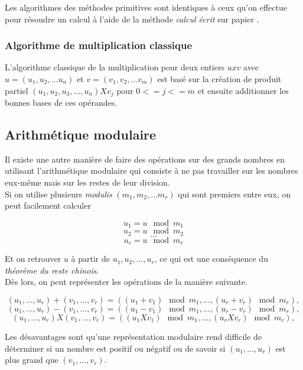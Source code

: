 \documentclass[letterpaper]{article}
\begin{document}
Les algorithmes des méthodes primitives sont identiques à ceux qu'on effectue
pour résoudre un calcul à l'aide de la méthode \emph{calcul écrit} sur papier
\cite{knuth1997aocp}.

\subsubsection{Algorithme de multiplication classique}

L'algorithme classique de la multiplication pour deux entiers $u x v$ avec
$u = (u_1, u_2, \dots u_n)$ et $v = (v_1, v_2, \dots v_m)$ est basé sur la
création de produit partiel $(u_1, u_2, u_3, \dots, u_n) X v_j$ pour
$0 <= j <= m$  et ensuite additionner les bonnes bases de ces opérandes.


\subsection{Arithmétique modulaire}

Il existe une autre manière de faire des opérations sur des grands nombres
en utilisant l'arithmétique modulaire qui consiste à ne pas travailler sur les
nombres eux-même mais sur les restes de leur division\cite{wikiamodulaire}.\\

Si on utilise plusieurs \emph{modulis} $(m_1, m_2, \dots m_r)$ qui sont
premiers entre eux, on peut facilement calculer

  $$u_1 = u \mod m_1$$
  $$u_2 = u \mod m_2$$
  $$\dots$$
  $$u_r = u \mod m_r$$

Et on retrouver $u$ à partir de $u_1, u_2, \dots, u_r$, ce qui
est une conséquence du \emph{théorème du reste chinois}.\\

Dès lors, on peut représenter les opérations de la manière suivante.

  $$(u_1, \dots, u_r) + (v_1, \dots, v_r) = ((u_1 + v_1) \mod m_1, \dots, (u_r + v_r) \mod m_r),$$
  $$(u_1, \dots, u_r) - (v_1, \dots, v_r) = ((u_1 - v_1) \mod m_1, \dots, (u_r - v_r) \mod m_r),$$
  $$(u_1, \dots, u_r) X (v_1, \dots, v_r) = ((u_1 X v_1) \mod m_1, \dots, (u_r X v_r) \mod m_r),$$

Les désavantages sont qu'une représentation modulaire rend difficile de
déterminer si un nombre est positif ou négatif ou de savoir si
$(u_1, \dots, u_r)$ est plus grand que $(v_1, \dots, v_r)$.
\end{document}
